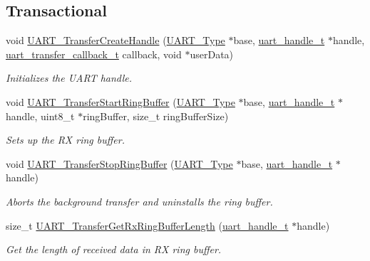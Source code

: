 \subsection*{Transactional}
\begin{DoxyCompactItemize}
\item 
void \mbox{\hyperlink{group__uart__driver_ga63db308c32019b7dd6c0647d618e5247}{U\+A\+R\+T\+\_\+\+Transfer\+Create\+Handle}} (\mbox{\hyperlink{struct_u_a_r_t___type}{U\+A\+R\+T\+\_\+\+Type}} $\ast$base, \mbox{\hyperlink{struct__uart__handle}{uart\+\_\+handle\+\_\+t}} $\ast$handle, \mbox{\hyperlink{group__uart__driver_ga2868b6ea396ab212547f2157380429c5}{uart\+\_\+transfer\+\_\+callback\+\_\+t}} callback, void $\ast$user\+Data)
\begin{DoxyCompactList}\small\item\em Initializes the U\+A\+RT handle. \end{DoxyCompactList}\item 
void \mbox{\hyperlink{group__uart__driver_ga223fba584bfabd599629d5ce92f929ac}{U\+A\+R\+T\+\_\+\+Transfer\+Start\+Ring\+Buffer}} (\mbox{\hyperlink{struct_u_a_r_t___type}{U\+A\+R\+T\+\_\+\+Type}} $\ast$base, \mbox{\hyperlink{struct__uart__handle}{uart\+\_\+handle\+\_\+t}} $\ast$handle, uint8\+\_\+t $\ast$ring\+Buffer, size\+\_\+t ring\+Buffer\+Size)
\begin{DoxyCompactList}\small\item\em Sets up the RX ring buffer. \end{DoxyCompactList}\item 
void \mbox{\hyperlink{group__uart__driver_ga0c0bc73df49cb31dff0e903630314f5b}{U\+A\+R\+T\+\_\+\+Transfer\+Stop\+Ring\+Buffer}} (\mbox{\hyperlink{struct_u_a_r_t___type}{U\+A\+R\+T\+\_\+\+Type}} $\ast$base, \mbox{\hyperlink{struct__uart__handle}{uart\+\_\+handle\+\_\+t}} $\ast$handle)
\begin{DoxyCompactList}\small\item\em Aborts the background transfer and uninstalls the ring buffer. \end{DoxyCompactList}\item 
size\+\_\+t \mbox{\hyperlink{group__uart__driver_ga3921aa660977ca77dadf95fa35f1c3a9}{U\+A\+R\+T\+\_\+\+Transfer\+Get\+Rx\+Ring\+Buffer\+Length}} (\mbox{\hyperlink{struct__uart__handle}{uart\+\_\+handle\+\_\+t}} $\ast$handle)
\begin{DoxyCompactList}\small\item\em Get the length of received data in RX ring buffer. \end{DoxyCompactList}\item 

\end{DoxyCompactItemize}
